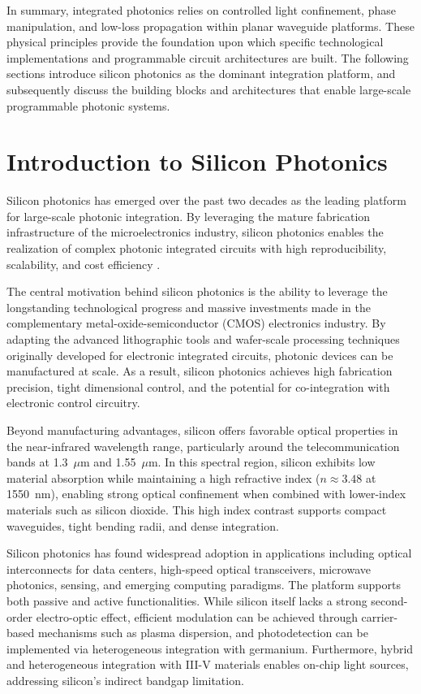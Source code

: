 In summary, integrated photonics relies on controlled light confinement, phase manipulation, and 
low-loss propagation within planar waveguide platforms. These physical principles provide the 
foundation upon which specific technological implementations and programmable circuit architectures 
are built. The following sections introduce silicon photonics as the dominant integration platform, 
and subsequently discuss the building blocks and architectures that enable large-scale programmable 
photonic systems.




\section{Introduction to Silicon Photonics} \label{sec:silicon_photonics}

Silicon photonics has emerged over the past two decades as the leading platform for large-scale 
photonic integration. By leveraging the mature fabrication infrastructure of the microelectronics 
industry, silicon photonics enables the realization of complex photonic integrated circuits
with high reproducibility, scalability, and cost efficiency 
\cite{sorefPresentFutureSilicon2006,thomsonRoadmapSiliconPhotonics2016}.

The central motivation behind silicon photonics is the ability to leverage the longstanding 
technological progress and massive investments made in the complementary metal-oxide-semiconductor 
(CMOS) electronics industry. By adapting the advanced lithographic tools and wafer-scale processing 
techniques originally developed for electronic integrated circuits, photonic devices can be 
manufactured at scale. As a result, silicon photonics achieves high fabrication precision, tight 
dimensional control, and the potential for co-integration with electronic control circuitry.

Beyond manufacturing advantages, silicon offers favorable optical properties in the near-infrared 
wavelength range, particularly around the telecommunication bands at 1.3~$\mu$m and 1.55~$\mu$m. 
In this spectral region, silicon exhibits low material absorption while maintaining a high 
refractive index ($n \approx 3.48$ at 1550~nm), enabling strong optical confinement when combined 
with lower-index materials such as silicon dioxide. This high index contrast supports compact 
waveguides, tight bending radii, and dense integration.

Silicon photonics has found widespread adoption in applications including optical interconnects 
\cite{khaniSiPMLHighbandwidthOptical2021} for data centers, high-speed optical transceivers, 
microwave photonics, sensing, and emerging computing paradigms. The platform supports both passive 
and active functionalities. While silicon itself lacks a strong second-order electro-optic effect, 
efficient modulation can be achieved through carrier-based mechanisms such as plasma dispersion, 
and photodetection can be implemented via heterogeneous integration with germanium. Furthermore, 
hybrid and heterogeneous integration with III-V materials enables on-chip light sources, addressing 
silicon's indirect bandgap limitation.

